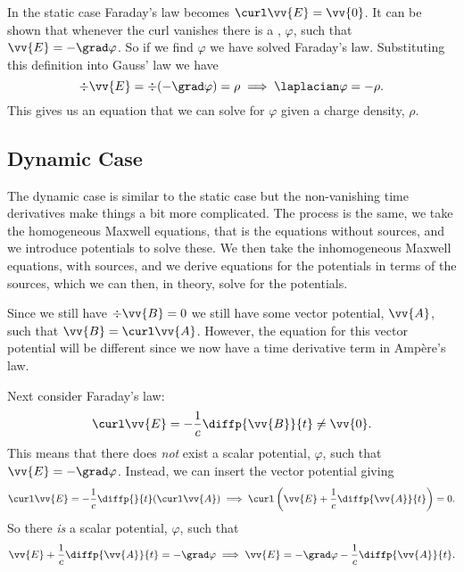 In the static case Faraday's law becomes \(\curl\vv{E} = \vv{0}\).
It can be shown that whenever the curl vanishes there is a , \(\varphi\), such that \(\vv{E} = -\grad\varphi\).
So if we find \(\varphi\) we have solved Faraday's law.
Substituting this definition into Gauss' law we have
\begin{equation}
    \div\vv{E} = \div(-\grad\varphi) = \rho \implies \laplacian\varphi = -\rho.
\end{equation}
This gives us an equation that we can solve for \(\varphi\) given a charge density, \(\rho\).

\subsection{Dynamic Case}
The dynamic case is similar to the static case but the non-vanishing time derivatives make things a bit more complicated.
The process is the same, we take the homogeneous Maxwell equations, that is the equations without sources, and we introduce potentials to solve these.
We then take the inhomogeneous Maxwell equations, with sources, and we derive equations for the potentials in terms of the sources, which we can then, in theory, solve for the potentials.

Since we still have \(\div\vv{B} = 0\) we still have some vector potential, \(\vv{A}\), such that \(\vv{B} = \curl\vv{A}\).
However, the equation for this vector potential will be different since we now have a time derivative term in Amp\`ere's law.

Next consider Faraday's law:
\begin{equation}
    \curl\vv{E} = -\frac{1}{c}\diffp{\vv{B}}{t} \ne \vv{0}.
\end{equation}
This means that there does \emph{not} exist a scalar potential, \(\varphi\), such that \(\vv{E} = -\grad\varphi\).
Instead, we can insert the vector potential giving
\begin{equation}
    \curl\vv{E} = -\frac{1}{c}\diffp{}{t}(\curl\vv{A}) \implies \curl\left( \vv{E} + \frac{1}{c}\diffp{\vv{A}}{t} \right) = 0.
\end{equation}
So there \emph{is} a scalar potential, \(\varphi\), such that
\begin{equation}
    \vv{E} + \frac{1}{c} \diffp{\vv{A}}{t} = -\grad\varphi \implies \vv{E} = -\grad\varphi - \frac{1}{c}\diffp{\vv{A}}{t}.
\end{equation}

